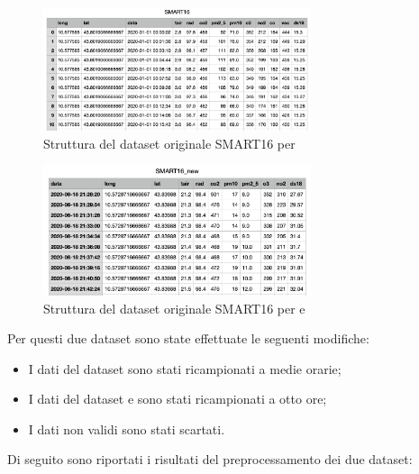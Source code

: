 \begin{figure}[H]
\centering
\captionsetup{justification=centering}
\includegraphics[width=0.7\textwidth,height=\textheight,keepaspectratio]{img/no2_smart_ds}
\caption{Struttura del dataset originale SMART16 per }
\label{fig:no2-smart-ds}
\end{figure}

\begin{figure}[H]
\centering
\captionsetup{justification=centering}
\includegraphics[width=0.7\textwidth,height=\textheight,keepaspectratio]{img/pm_smart_ds}
\caption{Struttura del dataset originale SMART16 per  e }
\label{fig:pm-smart-ds}
\end{figure}

Per questi due dataset sono state effettuate le seguenti modifiche:
\begin{itemize}
  \item I dati del dataset  sono stati ricampionati a medie orarie;
  \item I dati del dataset  e  sono stati ricampionati a otto ore;
  \item I dati non validi sono stati scartati.
\end{itemize}
Di seguito sono riportati i risultati del preprocessamento dei due dataset:

